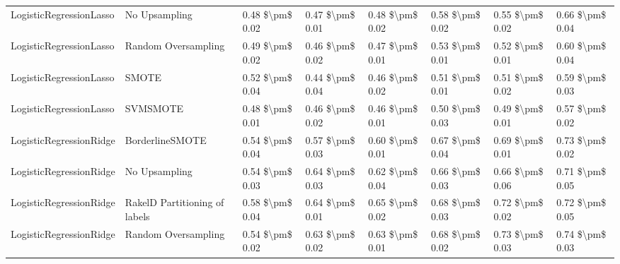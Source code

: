 \begin{tabular}{llllllll}
        LogisticRegressionLasso &                 No Upsampling & 0.48 \$\textbackslash pm\$ 0.02 &           0.47 \$\textbackslash pm\$ 0.01 &       0.48 \$\textbackslash pm\$ 0.02 &        0.58 \$\textbackslash pm\$ 0.02 &                         0.55 \$\textbackslash pm\$ 0.02 & 0.66 \$\textbackslash pm\$ 0.04 \\
        LogisticRegressionLasso &           Random Oversampling & 0.49 \$\textbackslash pm\$ 0.02 &           0.46 \$\textbackslash pm\$ 0.02 &       0.47 \$\textbackslash pm\$ 0.01 &        0.53 \$\textbackslash pm\$ 0.01 &                         0.52 \$\textbackslash pm\$ 0.01 & 0.60 \$\textbackslash pm\$ 0.04 \\
        LogisticRegressionLasso &                         SMOTE & 0.52 \$\textbackslash pm\$ 0.04 &           0.44 \$\textbackslash pm\$ 0.04 &       0.46 \$\textbackslash pm\$ 0.02 &        0.51 \$\textbackslash pm\$ 0.01 &                         0.51 \$\textbackslash pm\$ 0.02 & 0.59 \$\textbackslash pm\$ 0.03 \\
        LogisticRegressionLasso &                      SVMSMOTE & 0.48 \$\textbackslash pm\$ 0.01 &           0.46 \$\textbackslash pm\$ 0.02 &       0.46 \$\textbackslash pm\$ 0.01 &        0.50 \$\textbackslash pm\$ 0.03 &                         0.49 \$\textbackslash pm\$ 0.01 & 0.57 \$\textbackslash pm\$ 0.02 \\
        LogisticRegressionRidge &               BorderlineSMOTE & 0.54 \$\textbackslash pm\$ 0.04 &           0.57 \$\textbackslash pm\$ 0.03 &       0.60 \$\textbackslash pm\$ 0.01 &        0.67 \$\textbackslash pm\$ 0.04 &                         0.69 \$\textbackslash pm\$ 0.01 & 0.73 \$\textbackslash pm\$ 0.02 \\
        LogisticRegressionRidge &                 No Upsampling & 0.54 \$\textbackslash pm\$ 0.03 &           0.64 \$\textbackslash pm\$ 0.03 &       0.62 \$\textbackslash pm\$ 0.04 &        0.66 \$\textbackslash pm\$ 0.03 &                         0.66 \$\textbackslash pm\$ 0.06 & 0.71 \$\textbackslash pm\$ 0.05 \\
        LogisticRegressionRidge & RakelD Partitioning of labels & 0.58 \$\textbackslash pm\$ 0.04 &           0.64 \$\textbackslash pm\$ 0.01 &       0.65 \$\textbackslash pm\$ 0.02 &        0.68 \$\textbackslash pm\$ 0.03 &                         0.72 \$\textbackslash pm\$ 0.02 & 0.72 \$\textbackslash pm\$ 0.05 \\
        LogisticRegressionRidge &           Random Oversampling & 0.54 \$\textbackslash pm\$ 0.02 &           0.63 \$\textbackslash pm\$ 0.02 &       0.63 \$\textbackslash pm\$ 0.01 &        0.68 \$\textbackslash pm\$ 0.02 &                         0.73 \$\textbackslash pm\$ 0.03 & 0.74 \$\textbackslash pm\$ 0.03 \\

\end{tabular}
